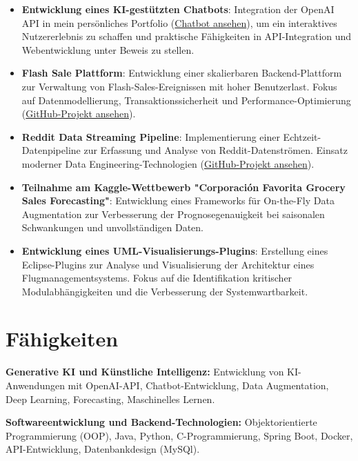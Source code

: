 \documentclass[10pt, letterpaper]{article}
\begin{document}
\begin{itemize}[leftmargin=*]
\item \textbf{Entwicklung eines KI-gestützten Chatbots}:  
Integration der OpenAI API in mein persönliches Portfolio (\href{https://personal-portfolio-mohamedayadidat.replit.app/chat}{Chatbot ansehen}), um ein interaktives Nutzererlebnis zu schaffen und praktische Fähigkeiten in API-Integration und Webentwicklung unter Beweis zu stellen.

\item \textbf{Flash Sale Plattform}:  
Entwicklung einer skalierbaren Backend-Plattform zur Verwaltung von Flash-Sales-Ereignissen mit hoher Benutzerlast. Fokus auf Datenmodellierung, Transaktionssicherheit und Performance-Optimierung (\href{https://github.com/Mayedi007/flash-sale-platform}{GitHub-Projekt ansehen}).

\item \textbf{Reddit Data Streaming Pipeline}:  
Implementierung einer Echtzeit-Datenpipeline zur Erfassung und Analyse von Reddit-Datenströmen. Einsatz moderner Data Engineering-Technologien (\href{https://github.com/Mayedi007/reddit-data-streaming-pipeline}{GitHub-Projekt ansehen}).

\item \textbf{Teilnahme am Kaggle-Wettbewerb "Corporación Favorita Grocery Sales Forecasting"}:  
Entwicklung eines Frameworks für On-the-Fly Data Augmentation zur Verbesserung der Prognosegenauigkeit bei saisonalen Schwankungen und unvollständigen Daten.

\item \textbf{Entwicklung eines UML-Visualisierungs-Plugins}:  
Erstellung eines Eclipse-Plugins zur Analyse und Visualisierung der Architektur eines Flugmanagementsystems. Fokus auf die Identifikation kritischer Modulabhängigkeiten und die Verbesserung der Systemwartbarkeit.
\end{itemize}

\vspace{0.2 cm}

\section{Fähigkeiten}

\textbf{Generative KI und Künstliche Intelligenz:}  
Entwicklung von KI-Anwendungen mit OpenAI-API, Chatbot-Entwicklung, Data Augmentation, Deep Learning, Forecasting, Maschinelles Lernen.

\textbf{Softwareentwicklung und Backend-Technologien:}  
Objektorientierte Programmierung (OOP), Java, Python, C-Programmierung, Spring Boot, Docker, API-Entwicklung, Datenbankdesign (MySQl).
\end{document}
